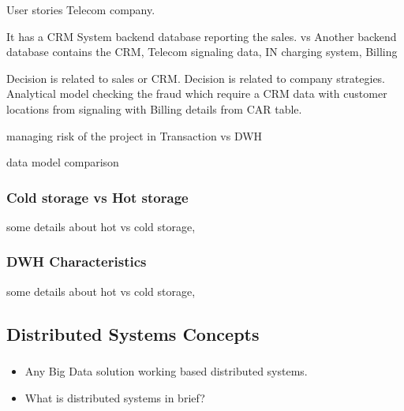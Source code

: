 User stories Telecom company.

It has a CRM System backend database reporting the sales. vs Another backend database contains the CRM, Telecom signaling data, IN charging system, Billing

Decision is related to sales or CRM. Decision is related to company strategies.
Analytical model checking the fraud which require a CRM data with customer locations from signaling with Billing details from CAR table.


managing risk of the project in Transaction vs DWH




data model comparison




\begin{frame}

\frametitle{Cold storage vs Hot storage}

some details about hot vs cold storage,

\end{frame}



\begin{frame}
\frametitle{DWH Characteristics}

some details about hot vs cold storage,

\end{frame}


\subsection{Distributed Systems Concepts}
\begin{frame}
\frametitle{\subsecname}
\begin{itemize}[<+->]
	\item Any Big Data solution working based distributed systems.
	\item What is distributed systems in brief?
\end{itemize}
\end{frame}


